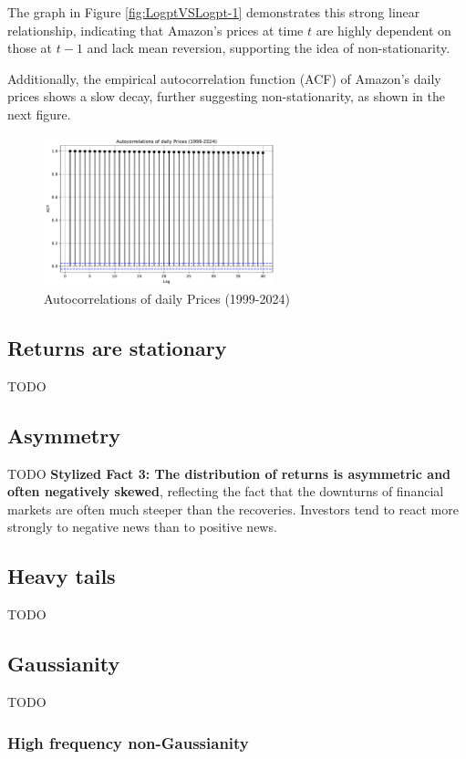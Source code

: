 \documentclass{article}
\begin{document}
\noindent The graph in Figure \ref{fig:LogptVSLogpt-1} demonstrates this strong linear 
relationship, indicating that Amazon's prices at time \( t \) are highly dependent on those at \( t-1 \) and lack mean reversion,
 supporting the idea of non-stationarity.

\noindent Additionally, the empirical autocorrelation function (ACF) of Amazon's daily prices shows a slow decay, further suggesting non-stationarity, as shown in the next figure.

\begin{figure}[H]
    \centering
    \includegraphics[width=0.6\textwidth]{Img/Autocorrelation.pdf}
    \caption{Autocorrelations of daily Prices (1999-2024)}
    \label{fig:Autocorrelations of daily Prices (1999-2024)}
\end{figure}

\subsection{Returns are stationary}
TODO
\subsection{Asymmetry}
TODO
\textbf{Stylized Fact 3: The distribution of returns is asymmetric and often negatively skewed}, reflecting the fact that the downturns of financial markets are often much steeper than the recoveries. Investors tend to react more strongly to negative news than to positive news.

\subsection{Heavy tails}
TODO
\subsection{Gaussianity}
TODO
\subsubsection{High frequency non-Gaussianity}
\end{document}
